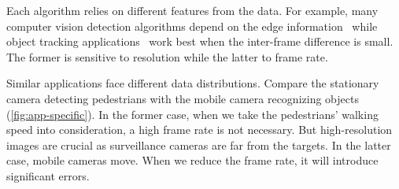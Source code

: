 Each algorithm relies on different features from the data. For example, many
computer vision detection algorithms depend on the edge
information~\cite{canny1986computational, lowe2004distinctive, viola2001rapid}
while object tracking applications~\cite{allen2004object} work best when the
inter-frame difference is small. The former is sensitive to resolution while the
latter to frame rate.

Similar applications face different data distributions. Compare the stationary
camera detecting pedestrians with the mobile camera recognizing objects
(\autoref{fig:app-specific}). In the former case, when we take the pedestrians'
walking speed into consideration, a high frame rate is not necessary. But
high-resolution images are crucial as surveillance cameras are far from the
targets. In the latter case, mobile cameras move. When we reduce the frame rate,
it will introduce significant errors.

